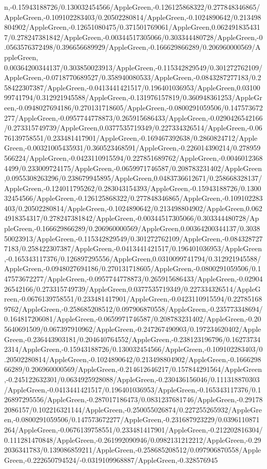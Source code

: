 {\begin{tikzternal}
{n,-0.15943188726/0.130032454566/AppleGreen,-0.126125868322/0.277848346865/AppleGreen,-0.109102283403/0.20502280814/AppleGreen,-0.1024890642/0.213498804902/AppleGreen,-0.12651080475/0.371501769061/AppleGreen,0.0624918354317/0.278247381842/AppleGreen,-0.00344517305066/0.303344480728/AppleGreen,-0.0563576372498/0.396656689929/AppleGreen,-0.166629866289/0.206960000569/AppleGreen,
0.00364200344137/0.303850023913/AppleGreen,-0.115342829549/0.301272762109/AppleGreen,-0.0718770689527/0.358940080533/AppleGreen,-0.0843287277183/0.258422307387/AppleGreen,-0.0413441421517/0.196401036953/AppleGreen,0.0310099741794/0.312921945588/AppleGreen,-0.131976157819/0.360948361253/AppleGreen,-0.0948027694186/0.270131718605/AppleGreen,-0.0800291059506/0.147573672277/AppleGreen,-0.0957744778873/0.265915686433/AppleGreen,-0.0290426542166/0.273315749739/AppleGreen,0.0377535719349/0.227334326514/AppleGreen,-0.0676139758551/0.233481417901/AppleGreen,-0.169467392638/0.2860824712/AppleGreen,-0.00321005435931/0.360523468591/AppleGreen,-0.226014390214/0.278959566224/AppleGreen,-0.0423110915594/0.227851689762/AppleGreen,-0.00460123684499/0.233009724175/AppleGreen,-0.0659971746587/0.208783231402/AppleGreen,0.0955308263296/0.238679945895/AppleGreen,0.0483736612671/0.258668328137/AppleGreen,-0.124011795262/0.283043154393/AppleGreen,-0.15943188726/0.130032454566/AppleGreen,-0.126125868322/0.277848346865/AppleGreen,-0.109102283403/0.20502280814/AppleGreen,-0.1024890642/0.213498804902/AppleGreen,0.0624918354317/0.278247381842/AppleGreen,-0.00344517305066/0.303344480728/AppleGreen,-0.166629866289/0.206960000569/AppleGreen,0.00364200344137/0.303850023913/AppleGreen,-0.115342829549/0.301272762109/AppleGreen,-0.0843287277183/0.258422307387/AppleGreen,-0.0413441421517/0.196401036953/AppleGreen,-0.165343117376/0.126897295556/AppleGreen,0.0310099741794/0.312921945588/AppleGreen,-0.0948027694186/0.270131718605/AppleGreen,-0.0800291059506/0.147573672277/AppleGreen,-0.0957744778873/0.265915686433/AppleGreen,-0.0290426542166/0.273315749739/AppleGreen,0.0377535719349/0.227334326514/AppleGreen,-0.0676139758551/0.233481417901/AppleGreen,-0.0423110915594/0.227851689762/AppleGreen,-0.258685208512/0.097906870558/AppleGreen,-0.235773348694/0.164817206081/AppleGreen,-0.0659971746587/0.208783231402/AppleGreen,-0.205640691509/0.067397910962/AppleGreen,-0.247267490903/0.197234620402/AppleGreen,-0.236443903181/0.204640764552/AppleGreen,-0.238123196796/0.162737342314/AppleGreen,-0.15943188726/0.130032454566/AppleGreen,-0.109102283403/0.20502280814/AppleGreen,-0.1024890642/0.213498804902/AppleGreen,-0.166629866289/0.206960000569/AppleGreen,-0.214612646217/0.157844291564/AppleGreen,-0.245122632301/0.0634925928088/AppleGreen,-0.230436156046/0.111318870303/AppleGreen,-0.0413441421517/0.196401036953/AppleGreen,-0.165343117376/0.126897295556/AppleGreen,-0.287017186473/0.0831237681746/AppleGreen,-0.291782086157/0.102216321144/AppleGreen,-0.250055026874/0.227255265932/AppleGreen,-0.0800291059506/0.147573672277/AppleGreen,-0.231687923229/0.0396110871264/AppleGreen,-0.0676139758551/0.233481417901/AppleGreen,-0.212202816304/0.111281470848/AppleGreen,-0.261992090946/0.0982131212212/AppleGreen,-0.292036341783/0.139086859211/AppleGreen,-0.258685208512/0.097906870558/AppleGreen,-0.222650794524/-0.0319109968887/AppleGreen,-0.328576945}
\end{tikzternal}}
